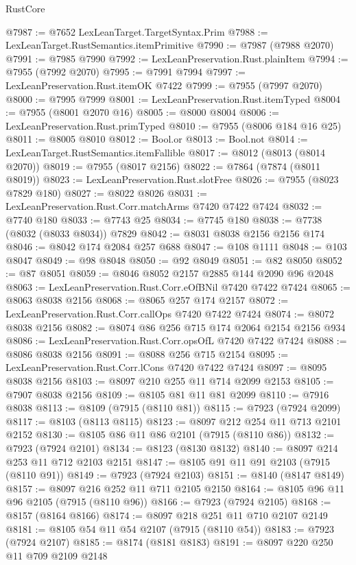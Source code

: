 \begin{lexlean}{RustCore}
\begin{coremodule}
@7987 := @7652 LexLeanTarget.TargetSyntax.Prim
@7988 := LexLeanTarget.RustSemantics.itemPrimitive
@7990 := @7987 (@7988 @2070)
@7991 := @7985 @7990
@7992 := LexLeanPreservation.Rust.plainItem
@7994 := @7955 (@7992 @2070)
@7995 := @7991 @7994
@7997 := LexLeanPreservation.Rust.itemOK @7422
@7999 := @7955 (@7997 @2070)
@8000 := @7995 @7999
@8001 := LexLeanPreservation.Rust.itemTyped
@8004 := @7955 (@8001 @2070 @16)
@8005 := @8000 @8004
@8006 := LexLeanPreservation.Rust.primTyped
@8010 := @7955 (@8006 @184 @16 @25)
@8011 := @8005 @8010
@8012 := Bool.or
@8013 := Bool.not
@8014 := LexLeanTarget.RustSemantics.itemFallible
@8017 := @8012 (@8013 (@8014 @2070))
@8019 := @7955 (@8017 @2156)
@8022 := @7864 (@7874 (@8011 @8019))
@8023 := LexLeanPreservation.Rust.slotFree
@8026 := @7955 (@8023 @7829 @180)
@8027 := @8022 @8026
@8031 := LexLeanPreservation.Rust.Corr.matchArms @7420 @7422 @7424
@8032 := @7740 @180
@8033 := @7743 @25
@8034 := @7745 @180
@8038 := @7738 (@8032 (@8033 @8034)) @7829
@8042 := @8031 @8038 @2156 @2156 @174
@8046 := @8042 @174 @2084 @257 @688
@8047 := @108 @1111
@8048 := @103 @8047
@8049 := @98 @8048
@8050 := @92 @8049
@8051 := @82 @8050
@8052 := @87 @8051
@8059 := @8046 @8052 @2157 @2885 @144 @2090 @96 @2048
@8063 := LexLeanPreservation.Rust.Corr.eOfBNil @7420 @7422 @7424
@8065 := @8063 @8038 @2156
@8068 := @8065 @257 @174 @2157
@8072 := LexLeanPreservation.Rust.Corr.callOps @7420 @7422 @7424
@8074 := @8072 @8038 @2156
@8082 := @8074 @86 @256 @715 @174 @2064 @2154 @2156 @934
@8086 := LexLeanPreservation.Rust.Corr.opsOfL @7420 @7422 @7424
@8088 := @8086 @8038 @2156
@8091 := @8088 @256 @715 @2154
@8095 := LexLeanPreservation.Rust.Corr.lCons @7420 @7422 @7424
@8097 := @8095 @8038 @2156
@8103 := @8097 @210 @255 @11 @714 @2099 @2153
@8105 := @7907 @8038 @2156
@8109 := @8105 @81 @11 @81 @2099
@8110 := @7916 @8038
@8113 := @8109 (@7915 (@8110 @81))
@8115 := @7923 (@7924 @2099)
@8117 := @8103 (@8113 @8115)
@8123 := @8097 @212 @254 @11 @713 @2101 @2152
@8130 := @8105 @86 @11 @86 @2101 (@7915 (@8110 @86))
@8132 := @7923 (@7924 @2101)
@8134 := @8123 (@8130 @8132)
@8140 := @8097 @214 @253 @11 @712 @2103 @2151
@8147 := @8105 @91 @11 @91 @2103 (@7915 (@8110 @91))
@8149 := @7923 (@7924 @2103)
@8151 := @8140 (@8147 @8149)
@8157 := @8097 @216 @252 @11 @711 @2105 @2150
@8164 := @8105 @96 @11 @96 @2105 (@7915 (@8110 @96))
@8166 := @7923 (@7924 @2105)
@8168 := @8157 (@8164 @8166)
@8174 := @8097 @218 @251 @11 @710 @2107 @2149
@8181 := @8105 @54 @11 @54 @2107 (@7915 (@8110 @54))
@8183 := @7923 (@7924 @2107)
@8185 := @8174 (@8181 @8183)
@8191 := @8097 @220 @250 @11 @709 @2109 @2148

\end{coremodule}
\end{lexlean}
